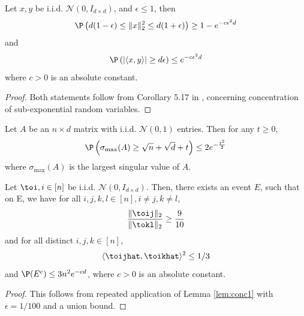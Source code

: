 \begin{lemma}
\label{lem:conc1}
Let $x,y$ be i.i.d. $\mathcal{N}(0,I_{d\times d})$, and $\epsilon \leq 1$, then
\[
\P\left ( d(1-\epsilon) \leq \|x\|_2^2 \leq d(1+\epsilon) \right) \geq 1- e^{-c \epsilon^2 d}
\]
and
\[
\P \left( |\langle x, y \rangle| \geq d\epsilon \right) \leq e^{-c\epsilon^2 d}
\]
where $c>0$ is an absolute constant.
\end{lemma}
\begin{proof}
Both statements follow from Corollary 5.17 in \cite{Vershynin}, concerning concentration of sub-exponential random variables.
\end{proof}

\begin{lemma}
\label{lem:conc2}
Let $A$ be an $n \times d$ matrix with i.i.d. $\mathcal{N}(0,1)$ entries. Then for any $t\geq 0$,
\[
\P\left( \sigma_{\max}(A) \geq \sqrt{n} + \sqrt{d} + t \right) \leq 2e^{-\frac{t^2}{2}}
\]
where $\sigma_{\max}(A)$ is the largest singular value of $A$.
\end{lemma}


\begin{lemma}
\label{lem:conc3}
Let $\toi, i \in [n]$ be i.i.d. $\mathcal{N}(0,I_{d \times d})$. Then, there exists an event $E$, such that on E, we have for all $i,j,k,l \in [n], i \neq j, k\neq l$,
\[
\frac{\|\toij\|_2}{\|\tokl\|_2} \geq \frac{9}{10}
\]
and for all distinct $i,j,k \in [n]$,
\[
\langle \toijhat,\toikhat \rangle^2 \leq 1/3
\]
and $\P(E^c) \leq 3n^2 e^{-cd}$,
where $c>0$ is an absolute constant. 
\end{lemma}
\begin{proof}
This follows from repeated application of Lemma \ref{lem:conc1} with $\epsilon = 1/100$ and a union bound.
\end{proof}

